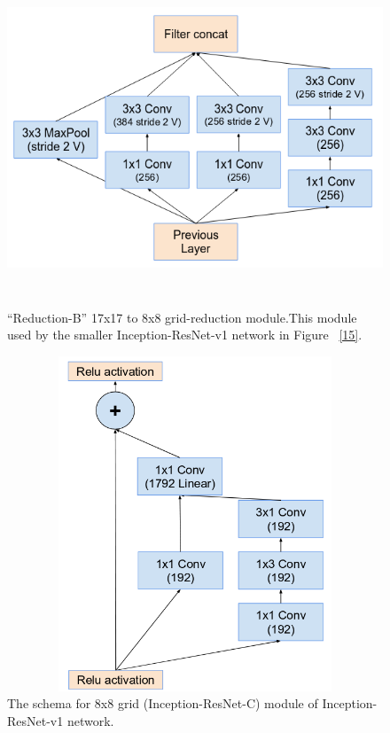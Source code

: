 \documentclass[a4paper,12pt, twoside]{NITKReport}
\begin{document}
\begin{figure}

\centering
\includegraphics[height=10cm,width=13cm]{figure12.png}
    \caption{“Reduction-B” 17x17 to 8x8 grid-reduction module.This module used by the smaller Inception-ResNet-v1 network in Figure ~\ref{15}.}
\label{12}
\end{figure}

\begin{figure}[h]
  \centering
    
    \includegraphics[height=10cm,width=13cm]{figure13.png}
    \caption{ The schema for 8x8 grid (Inception-ResNet-C) module of Inception-ResNet-v1 network.}
    \label{13}
   \end{figure}
 
\end{document}
